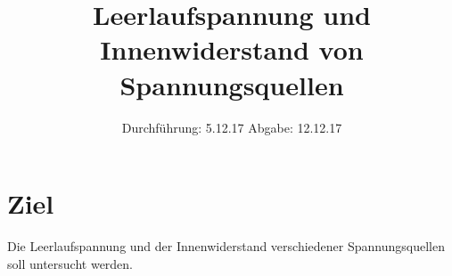 

\subject{V301}
\title{Leerlaufspannung und Innenwiderstand von Spannungsquellen}
\date{%
  Durchführung: 5.12.17
  \hspace{3em}
  Abgabe: 12.12.17
}



\maketitle
\thispagestyle{empty}
\tableofcontents
\newpage

\section{Ziel}
\label{sec:Ziel}

Die Leerlaufspannung und der Innenwiderstand verschiedener Spannungsquellen soll untersucht werden.






\printbibliography{}


